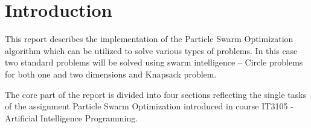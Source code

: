 \section{Introduction}
This report describes the implementation of the Particle Swarm Optimization algorithm which can be utilized to solve various types of problems. In this case two standard problems will be solved using swarm intelligence -- Circle problems for both one and two dimensions and Knapsack problem.

The core part of the report is divided into four sections reflecting the single tasks of the assignment Particle Swarm Optimization introduced in course IT3105 - Artificial Intelligence Programming.
